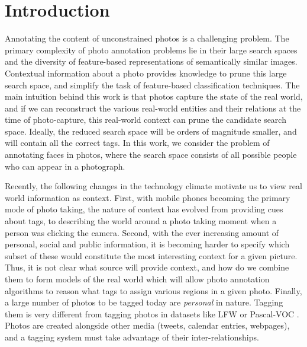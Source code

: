 \chapter{Introduction}

Annotating the content of unconstrained photos is a challenging problem. The primary complexity of photo annotation problems lie in their large search spaces and the diversity of feature-based representations of semantically similar images. Contextual information about a photo provides knowledge to prune this large search space, and simplify the task of feature-based classification techniques. The main intuition behind this work is that photos capture the state of the real world, and if we can reconstruct the various real-world entities and their relations at the time of photo-capture, this real-world context can prune the candidate search space. Ideally, the reduced search space will be orders of magnitude smaller, and will contain all the correct tags. In this work, we consider the problem of annotating faces in photos, where the search space consists of all possible people who can appear in a photograph.

Recently, the following changes in the technology climate motivate us to view real world information as context. First, with mobile phones becoming the primary mode of photo taking, the nature of context has evolved from providing cues about tags, to describing the world around a photo taking moment when a person was clicking the camera. Second, with the ever increasing amount of personal, social and public information, it is becoming harder to specify which subset of these would constitute the most interesting context for a given picture. Thus, it is not clear what source will provide context, and how do we combine them to form models of the real world which will allow photo annotation algorithms to reason what tags to assign various regions in a given photo. Finally, a large number of photos to be tagged today are \textit{personal} in nature. Tagging them is very different from tagging photos in datasets like LFW \cite{huang2008labeled} or Pascal-VOC \cite{everingham2010pascal}. Photos are created alongside other media (tweets, calendar entries, webpages), and a tagging system must take advantage of their inter-relationships.


